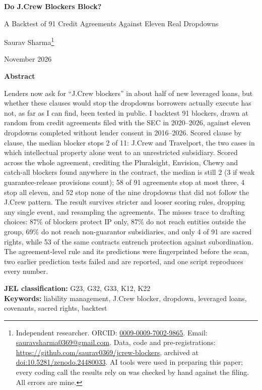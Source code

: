 \documentclass[12pt]{article}
\begin{document}
\begin{titlepage}\renewcommand{\thefootnote}{\fnsymbol{footnote}}
\centering{}
{\LARGE\bfseries Do J.Crew Blockers Block?\par}
\vspace{4pt}
{\Large A Backtest of 91 Credit Agreements Against Eleven Real Dropdowns\par}
\vspace{18pt}
{\large Saurav Sharma\footnote{\raggedright Independent researcher. ORCID: \href{https://orcid.org/0009-0009-7002-9865}{0009-0009-7002-9865}. Email: \href{mailto:sauravsharma0369@gmail.com}{sauravsharma0369@gmail.com}. Data, code and pre-registrations: \url{https://github.com/saurav0369/jcrew-blockers}, archived at \href{https://doi.org/10.5281/zenodo.24480033}{doi:10.5281/zenodo.24480033}. AI tools were used in preparing this paper; every coding call the results rely on was checked by hand against the filing. All errors are mine.}\par}
\vspace{8pt}
{\normalsize November 2026\par}
\vspace{24pt}
\begin{minipage}{0.88\textwidth}\small
\centerline{\bfseries Abstract}\vspace{4pt}
Lenders now ask for ``J.Crew blockers'' in about half of new leveraged loans, but whether these clauses would stop the dropdowns borrowers actually execute has not, as far as I can find, been tested in public. I backtest 91 blockers, drawn at random from credit agreements filed with the SEC in 2020--2026, against eleven dropdowns completed without lender consent in 2016--2026. Scored clause by clause, the median blocker stops 2 of 11: J.Crew and Travelport, the two cases in which intellectual property alone went to an unrestricted subsidiary. Scored across the whole agreement, crediting the Pluralsight, Envision, Chewy and catch-all blockers found anywhere in the contract, the median is still 2 (3 if weak guarantee-release provisions count); 58 of 91 agreements stop at most three, 4 stop all eleven, and 52 stop none of the nine dropdowns that did not follow the J.Crew pattern. The result survives stricter and looser scoring rules, dropping any single event, and resampling the agreements. The misses trace to drafting choices: 87\% of blockers protect IP only, 87\% do not reach entities outside the group, 69\% do not reach non-guarantor subsidiaries, and only 4 of 91 are sacred rights, while 53 of the same contracts entrench protection against subordination. The agreement-level rule and its predictions were fingerprinted before the scan, two earlier prediction tests failed and are reported, and one script reproduces every number.

\vspace{8pt}
\noindent\textbf{JEL classification:} G23, G32, G33, K12, K22\\
\textbf{Keywords:} liability management, J.Crew blocker, dropdown, leveraged loans, covenants, sacred rights, backtest
\end{minipage}
\end{titlepage}\setcounter{footnote}{0}
\end{document}
